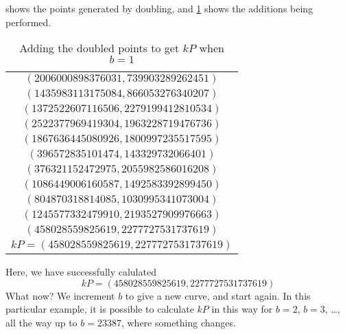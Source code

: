  shows the points generated by doubling, and \cref{unsuccessfuladd} shows the additions being performed.
\begin{table}[htbp]
	\centering
	\begin{tabular}{c}
		$(2006000898376031, 739903289262451)$\\
		$(1435983113175084, 866053276340207)$\\
		$(1372522607116506, 2279199412810534)$\\
		$(2522377969419304, 1963228719476736)$\\
		$(1867636445080926, 1800997235517595)$\\
		$(396572835101474, 143329732066401)$\\
		$(376321152472975, 2055982586016208)$\\
		$(1086449006160587, 1492583392899450)$\\
		$(804870318814085, 1030995341073004)$\\
		$(1245577332479910, 2193527909976663)$\\
		$(458028559825619, 2277727531737619)$\\
		$kP = (458028559825619,2277727531737619)$
	\end{tabular}
	\caption{Adding the doubled points to get $kP$ when $b=1$}
	\label{unsuccessfuladd}
\end{table}
Here, we have successfully calulated
$$kP = (458028559825619,2277727531737619)$$
What now?
We increment $b$ to give a new curve, and start again. In this particular example, it is possible to calculate $kP$ in this way for $b=2$, $b=3$, \ldots, all the way up to $b=23387$, where something changes.
